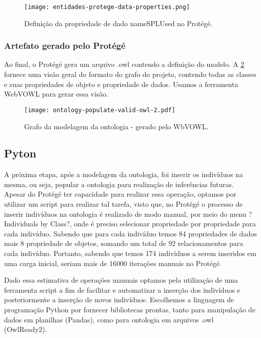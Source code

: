 \begin{figure}[htb]
	\centering 
	\texttt{[image: entidades-protege-data-properties.png]}
	\caption{Definição da propriedade de dado nameSPLUsed no Protégé.}
	\label{figure:data_prop_defition_protege}
\end{figure}

\subsubsection{Artefato gerado pelo Protégé}

Ao final, o Protégé gera um arquivo .owl contendo a definição do modelo. A \ref{figure:graph_ontology_model} fornece uma visão geral do formato do grafo do projeto, contendo todas as classes e suas propriedades de objeto e propriedade de dados. Usamos a ferramenta WebVOWL \cite{lohmann2016visualizing} para gerar essa visão.

\begin{figure}[htb]
	\centering 
	\texttt{[image: ontology-populate-valid-owl-2.pdf]}
	\caption{Grafo da modelagem da ontologia - gerado pelo WbVOWL.}
	\label{figure:graph_ontology_model}
\end{figure}

\subsection{Pyton}
\label{sec:python}

A próxima etapa, após a modelagem da ontologia, foi inserir os indivíduos na mesma, ou seja, popular a ontologia para realização de inferências futuras. Apesar do Protégé ter capacidade para realizar essa operação, optamos por utilizar um script para realizar tal tarefa, visto que, no Protégé o processo de inserir indivíduos na ontologia é realizado de modo manual, por meio do menu ?Individuals by Class?, onde é preciso selecionar propriedade por propriedade para cada indivíduo. Sabendo que para cada indivíduo temos 84 propriedades de dados mais 8 propriedade de objetos, somando um total de 92 relacionamentos para cada indivíduo. Portanto, sabendo que temos 174 indivíduos a serem inseridos em uma carga inicial, seriam mais de 16000 iterações manuais no Protégé.

Dado essa estimativa de operações manuais optamos pela utilização de uma ferramenta script a fim de facilitar e automatizar a inserção dos indivíduos e posteriormente a inserção de novos indivíduos. Escolhemos a linguagem de programação Python por fornecer bibliotecas prontas, tanto para manipulação de dados em planilhas (Pandas), como para ontologia em arquivos .owl (OwlReady2).

